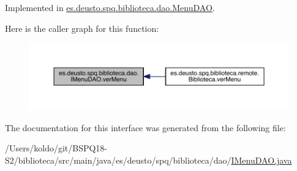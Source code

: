 Implemented in \mbox{\hyperlink{classes_1_1deusto_1_1spq_1_1biblioteca_1_1dao_1_1_menu_d_a_o_ae05c2b05b530f98bcfc8ad1146f4efd7}{es.\+deusto.\+spq.\+biblioteca.\+dao.\+Menu\+D\+AO}}.

Here is the caller graph for this function\+:
\nopagebreak
\begin{figure}[H]
\begin{center}
\leavevmode
\includegraphics[width=350pt]{interfacees_1_1deusto_1_1spq_1_1biblioteca_1_1dao_1_1_i_menu_d_a_o_ac92176efdcf5f320225152392db8cb8a_icgraph}
\end{center}
\end{figure}


The documentation for this interface was generated from the following file\+:\begin{DoxyCompactItemize}
\item 
/\+Users/koldo/git/\+B\+S\+P\+Q18-\/\+S2/biblioteca/src/main/java/es/deusto/spq/biblioteca/dao/\mbox{\hyperlink{_i_menu_d_a_o_8java}{I\+Menu\+D\+A\+O.\+java}}\end{DoxyCompactItemize}
